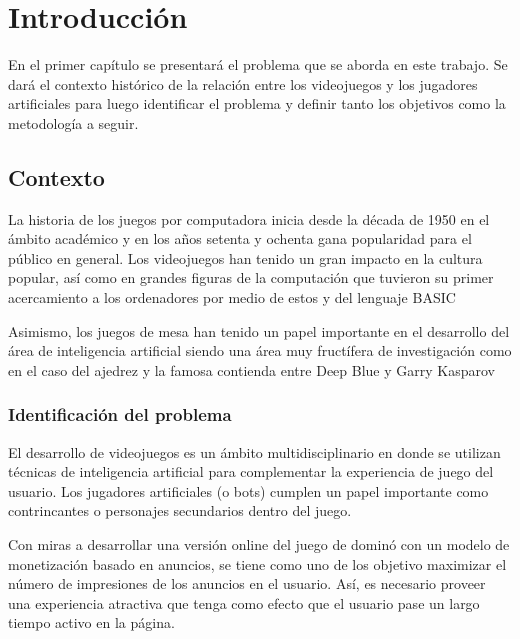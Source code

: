 \chapter*{Introducción}


\noindent

En el primer capítulo se presentará el problema que se aborda en este trabajo.
Se dará el contexto histórico de la relación entre los videojuegos y los
jugadores artificiales para luego identificar el problema y definir tanto los
objetivos como la metodología a seguir.

\section{Contexto}

La historia de los juegos por computadora inicia desde la década de 1950 en el
ámbito académico y en los años setenta y ochenta gana popularidad para el
público en general. Los videojuegos han tenido un gran impacto en la cultura
popular, así como en grandes figuras de la computación que tuvieron su primer
acercamiento a los ordenadores por medio de estos y del lenguaje BASIC

Asimismo, los juegos de mesa han tenido un papel importante en el desarrollo del
área de inteligencia artificial siendo una área muy fructífera de investigación
como en el caso del ajedrez y la famosa contienda entre Deep Blue y Garry
Kasparov

\subsection{Identificación del problema}

El desarrollo de videojuegos es un ámbito multidisciplinario en donde se
utilizan técnicas de inteligencia artificial para complementar la experiencia de
juego del usuario. Los jugadores artificiales (o bots) cumplen un papel
importante como contrincantes o personajes secundarios dentro del juego.

Con miras a desarrollar una versión online del juego de dominó con un modelo de
monetización basado en anuncios, se tiene como uno de los objetivo maximizar el
número de impresiones de los anuncios en el usuario. Así, es necesario proveer
una experiencia atractiva que tenga como efecto que el usuario pase un largo
tiempo activo en la página.

